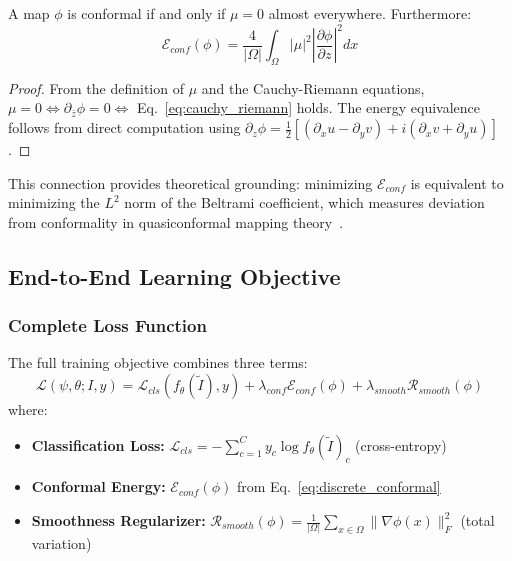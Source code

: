 \begin{proposition}
\label{prop:beltrami}
A map $\phi$ is conformal if and only if $\mu = 0$ almost everywhere. Furthermore:
\begin{equation}
\mathcal{E}_{conf}(\phi) = \frac{4}{|\Omega|} \int_\Omega |\mu|^2 \left| \frac{\partial \phi}{\partial z} \right|^2 dx
\end{equation}
\end{proposition}

\begin{proof}
From the definition of $\mu$ and the Cauchy-Riemann equations, $\mu = 0 \Leftrightarrow \partial_{\bar{z}} \phi = 0 \Leftrightarrow$ Eq.~\eqref{eq:cauchy_riemann} holds. The energy equivalence follows from direct computation using $\partial_z \phi = \frac{1}{2}[(\partial_x u - \partial_y v) + i(\partial_x v + \partial_y u)]$.
\end{proof}

This connection provides theoretical grounding: minimizing $\mathcal{E}_{conf}$ is equivalent to minimizing the $L^2$ norm of the Beltrami coefficient, which measures deviation from conformality in quasiconformal mapping theory~\cite{beltrami_ref}.

\subsection{End-to-End Learning Objective}
\label{subsec:objective}

\subsubsection{Complete Loss Function}

The full training objective combines three terms:
\begin{equation}
\mathcal{L}(\psi, \theta; I, y) = \mathcal{L}_{cls}(f_\theta(\tilde{I}), y) + \lambda_{conf} \mathcal{E}_{conf}(\phi) + \lambda_{smooth} \mathcal{R}_{smooth}(\phi)
\label{eq:full_loss}
\end{equation}
where:
\begin{itemize}
    \item \textbf{Classification Loss:} $\mathcal{L}_{cls} = -\sum_{c=1}^C y_c \log f_\theta(\tilde{I})_c$ (cross-entropy)
    \item \textbf{Conformal Energy:} $\mathcal{E}_{conf}(\phi)$ from Eq.~\eqref{eq:discrete_conformal}
    \item \textbf{Smoothness Regularizer:} $\mathcal{R}_{smooth}(\phi) = \frac{1}{|\Omega|} \sum_{x \in \Omega} \|\nabla \phi(x)\|_F^2$ (total variation)
\end{itemize}

